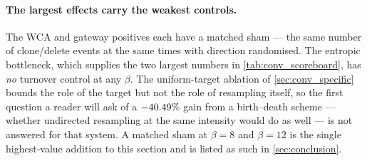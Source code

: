 \paragraph{The largest effects carry the weakest controls.}
The WCA and gateway positives each have a matched sham --- the same number of clone/delete
events at the same times with direction randomised. The entropic bottleneck, which supplies the
two largest numbers in \cref{tab:conv_scoreboard}, has \emph{no} turnover control at any
$\beta$. The uniform-target ablation of \cref{sec:conv_specific} bounds the role of the target
but not the role of resampling itself, so the first question a reader will ask of a $-40.49\%$
gain from a birth--death scheme --- whether undirected resampling at the same intensity would do
as well --- is not answered for that system. A matched sham at $\beta=8$ and $\beta=12$ is the
single highest-value addition to this section and is listed as such in
\cref{sec:conclusion}.
